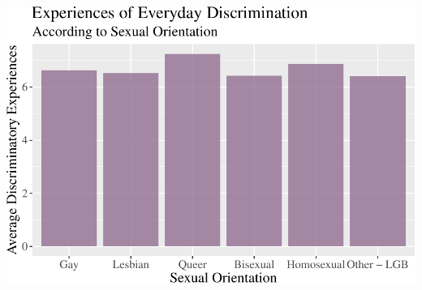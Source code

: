 \documentclass[
  english,
  man,floatsintext]{apa6}
\begin{document}
\includegraphics{prep_script_files/figure-latex/mean plot-1.pdf}
\end{document}
